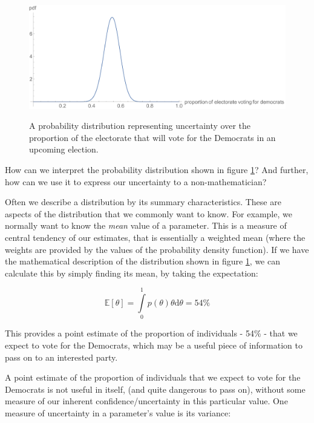 \documentclass[11pt,fullpage]{book}
\begin{document}
\begin{figure}
\centering
\scalebox{0.5} 
{\includegraphics{Posterior_electionProportion.pdf}}
\caption{A probability distribution representing uncertainty over the proportion of the electorate that will vote for the Democrats in an upcoming election.}\label{fig:Posterior_electionProportion}
\end{figure}

How can we interpret the probability distribution shown in figure \ref{fig:Posterior_electionProportion}? And further, how can we use it to express our uncertainty to a non-mathematician? 

Often we describe a distribution by its summary characteristics. These are aspects of the distribution that we commonly want to know. For example, we normally want to know the \textit{mean} value of a parameter. This is a measure of central tendency of our estimates, that is essentially a weighted mean (where the weights are provided by the values of the probability density function). If we have the mathematical description of the distribution shown in figure \ref{fig:Posterior_electionProportion}, we can calculate this by simply finding its mean, by taking the expectation:

\begin{equation}
\mathbb{E}[\theta] = \int\limits_{0}^{1} p(\theta)\theta \mathrm{d}\theta = 54\%
\end{equation}

This provides a point estimate of the proportion of individuals - 54\% - that we expect to vote for the Democrats, which may be a useful piece of information to pass on to an interested party. 

A point estimate of the proportion of individuals that we expect to vote for the Democrats is not useful in itself, (and quite dangerous to pass on), without some measure of our inherent confidence/uncertainty in this particular value. One measure of uncertainty in a parameter's value is its variance:
\end{document}
